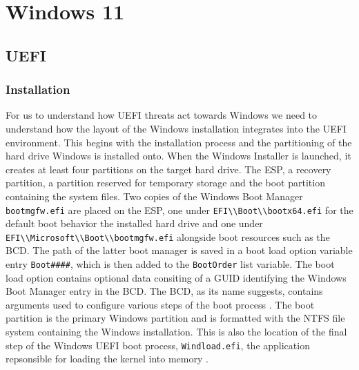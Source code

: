 

\chapter{Windows 11}


\section{\ac{UEFI}}

\subsection{Installation}

For us to understand how UEFI threats act towards Windows we need to understand how the layout of the Windows installation integrates into the UEFI environment.
This begins with the installation process and the partitioning of the hard drive Windows is installed onto.
When the Windows Installer is launched, it creates at least four partitions on the target hard drive.
The \acf{ESP}, a recovery partition, a partition reserved for temporary storage and the boot partition containing the system files.
Two copies of the Windows Boot Manager \lstinline{bootmgfw.efi} are placed on the \ac{ESP}, one under \lstinline{EFI\\Boot\\bootx64.efi} for the default boot behavior the installed hard drive and one under \lstinline{EFI\\Microsoft\\Boot\\bootmgfw.efi} alongside boot resources such as the \ac{BCD}.
The path of the latter boot manager is saved in a boot load option variable entry \lstinline{Boot####}, which is then added to the \lstinline{BootOrder} list variable.
The boot load option contains optional data consiting of a GUID identifying the Windows Boot Manager entry in the \ac{BCD}.
The \ac{BCD}, as its name suggests, contains arguments used to configure various steps of the boot process \cite[12. The Windows Boot Manager]{windows-internals-7-part2}.
The boot partition is the primary Windows partition and is formatted with the \ac{NTFS} file system containing the Windows installation.
This is also the location of the final step of the Windows UEFI boot process, \lstinline{Windload.efi}, the application repsonsible for loading the kernel into memory \cite[12. The Windows OS Loader]{windows-internals-7-part2}.

